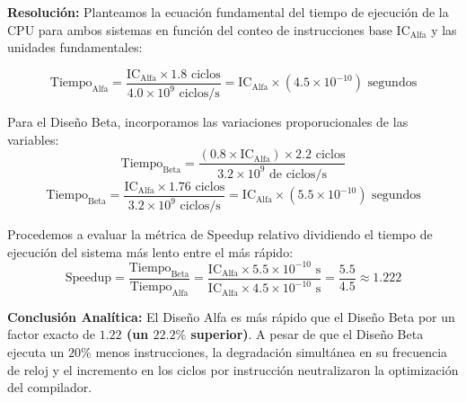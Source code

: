 \documentclass[12pt,letterpaper]{article}
\begin{document}
\textbf{Resolución:}
Planteamos la ecuación fundamental del tiempo de ejecución de la CPU para ambos sistemas en función del conteo de instrucciones base $\text{IC}_{\text{Alfa}}$ y las unidades fundamentales:

\begin{equation}
\text{Tiempo}_{\text{Alfa}} = \frac{\text{IC}_{\text{Alfa}} \times 1.8 \text{ ciclos}}{4.0 \times 10^9\text{ ciclos}/\text{s}} = \text{IC}_{\text{Alfa}} \times (4.5 \times 10^{-10})\text{ segundos}
\end{equation}

Para el Diseño Beta, incorporamos las variaciones proporucionales de las variables:
\begin{equation}
\text{Tiempo}_{\text{Beta}} = \frac{(0.8 \times \text{IC}_{\text{Alfa}}) \times 2.2 \text{ ciclos}}{3.2 \times 10^9\text{ de ciclos}/\text{s}}
\end{equation}
\begin{equation}
\text{Tiempo}_{\text{Beta}} = \frac{\text{IC}_{\text{Alfa}} \times 1.76 \text{ ciclos}}{3.2 \times 10^9\text{ ciclos}/\text{s}} = \text{IC}_{\text{Alfa}} \times (5.5 \times 10^{-10})\text{ segundos}
\end{equation}

Procedemos a evaluar la métrica de Speedup relativo dividiendo el tiempo de ejecución del sistema más lento entre el más rápido:
\begin{equation}
\text{Speedup} = \frac{\text{Tiempo}_{\text{Beta}}}{\text{Tiempo}_{\text{Alfa}}} = \frac{\text{IC}_{\text{Alfa}} \times 5.5 \times 10^{-10}\text{ s}}{\text{IC}_{\text{Alfa}} \times 4.5 \times 10^{-10}\text{ s}} = \frac{5.5}{4.5} \approx 1.222
\end{equation}

\textbf{Conclusión Analítica:} El Diseño Alfa es más rápido que el Diseño Beta por un factor exacto de \textbf{$1.22$ (un $22.2\%$ superior)}. A pesar de que el Diseño Beta ejecuta un $20\%$ menos instrucciones, la degradación simultánea en su frecuencia de reloj y el incremento en los ciclos por instrucción neutralizaron la optimización del compilador.

\vspace{0.6cm}
\end{document}
